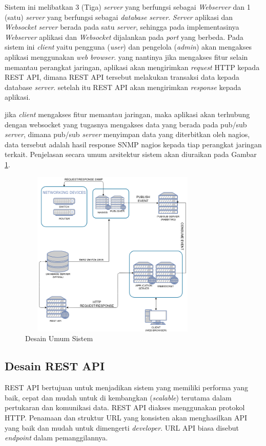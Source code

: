 			Sistem ini melibatkan 3 (Tiga) \textit{server} yang berfungsi sebagai \textit{Webserver} dan 1 (satu) \textit{server} yang berfungsi sebagai \textit{database server}. \textit{Server} aplikasi dan \textit{Websocket} \textit{server} berada pada satu \textit{server}, sehingga pada implementasinya \textit{Webserver} aplikasi dan \textit{Websocket} dijalankan pada \textit{port} yang berbeda. Pada sistem ini \textit{client} yaitu pengguna (\textit{user}) dan pengelola (\textit{admin}) akan mengakses aplikasi menggunakan \textit{web} \textit{browser}. yang nantinya jika mengakses fitur selain memantau perangkat jaringan, aplikasi akan mengirimkan \textit{request} HTTP kepada REST API, dimana REST API tersebut melakukan transaksi data kepada database \textit{server}. setelah itu REST API akan mengirimkan \textit{response} kepada aplikasi.
			
			jika \textit{client} mengakses fitur memantau jaringan, maka aplikasi akan terhubung dengan websocket yang tugasnya mengakses data yang berada pada pub/sub \textit{server}, dimana pub/sub \textit{server} menyimpan data yang diterbitkan oleh nagios, data tersebut adalah hasil response SNMP nagios kepada tiap perangkat jaringan terkait.
			Penjelasan secara umum arsitektur sistem akan diuraikan pada Gambar \ref{DesainUmumSistem}.
            \begin{figure}[H]
				\centering
				\includegraphics[width=9cm,height=8cm]{Images/C-3/main.png}
				\caption{Desain Umum Sistem}
				\label{DesainUmumSistem}
			\end{figure}

		\subsection{Desain REST API}
            	REST API bertujuan untuk menjadikan sistem yang memiliki performa yang baik, cepat dan mudah untuk di kembangkan (\textit{scalable}) terutama dalam pertukaran dan komunikasi data. REST API diakses menggunakan protokol HTTP. Penamaan dan struktur URL yang konsisten akan menghasilkan API yang baik dan mudah untuk dimengerti \textit{developer}. URL API biasa disebut \textit{endpoint} dalam pemanggilannya.
            	
